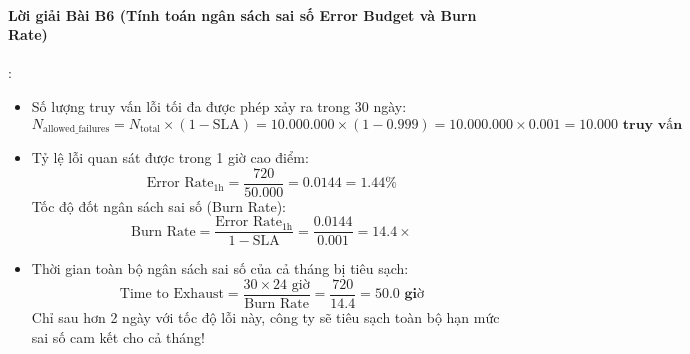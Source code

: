 \paragraph{Lời giải Bài B6 (Tính toán ngân sách sai số Error Budget và Burn Rate)}:
\begin{itemize}
  \item[a)] Số lượng truy vấn lỗi tối đa được phép xảy ra trong 30 ngày:
  \begin{equation*}
  N_{\text{allowed\_failures}} = N_{\text{total}} \times (1 - \text{SLA}) = 10.000.000 \times (1 - 0.999) = 10.000.000 \times 0.001 = \mathbf{10.000\text{ truy vấn}}
  \end{equation*}

  \item[b)] Tỷ lệ lỗi quan sát được trong 1 giờ cao điểm:
  \begin{equation*}
  \text{Error Rate}_{\text{1h}} = \frac{720}{50.000} = 0.0144 = 1.44\%
  \end{equation*}
  Tốc độ đốt ngân sách sai số (Burn Rate):
  \begin{equation*}
  \text{Burn Rate} = \frac{\text{Error Rate}_{\text{1h}}}{1 - \text{SLA}} = \frac{0.0144}{0.001} = \mathbf{14.4\times}
  \end{equation*}

  \item[c)] Thời gian toàn bộ ngân sách sai số của cả tháng bị tiêu sạch:
  \begin{equation*}
  \text{Time to Exhaust} = \frac{30 \times 24\text{ giờ}}{\text{Burn Rate}} = \frac{720}{14.4} = \mathbf{50.0\text{ giờ}}
  \end{equation*}
  Chỉ sau hơn 2 ngày với tốc độ lỗi này, công ty sẽ tiêu sạch toàn bộ hạn mức sai số cam kết cho cả tháng!
\end{itemize}

